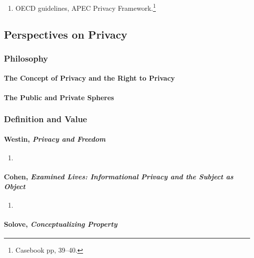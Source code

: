 \begin{enumerate}
    \item OECD guidelines, APEC Privacy Framework.\footnote{Casebook pp, 
    39--40.}
\end{enumerate}

\subsection{Perspectives on Privacy}

\subsubsection{Philosophy}

\paragraph{The Concept of Privacy and the Right to Privacy}


\paragraph{The Public and Private Spheres}


\subsubsection{Definition and Value}

\paragraph{Westin, \emph{Privacy and Freedom}}

\begin{enumerate}
    \item %
\end{enumerate}

\paragraph{Cohen, \emph{Examined Lives: Informational Privacy and the Subject 
as Object}}

\begin{enumerate}
    \item %
\end{enumerate}

\paragraph{Solove, \emph{Conceptualizing Property}}

